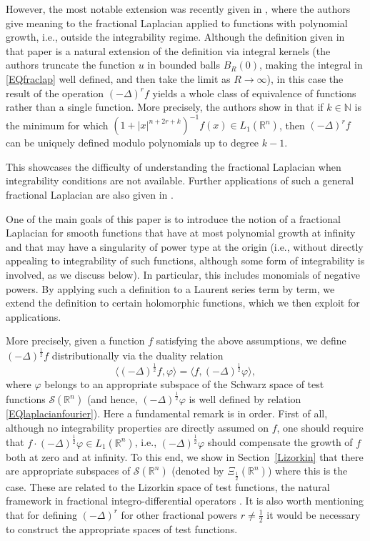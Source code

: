 \documentclass[reqno,11pt]{amsart}
\theoremstyle{definition}
\def\R{\mathbb{R}}
\begin{document}
\medskip

However, the most notable extension was recently given in \cite{POTENZEVALDIN}, where the authors give meaning to the fractional Laplacian applied to functions with polynomial growth, i.e., outside the integrability regime. Although the definition given in that paper is a natural extension of the definition via integral kernels (the authors truncate the function $u$ in bounded balls $B_R(0)$, making the integral in \eqref{EQfraclap} well defined, and then take the limit as $R\to\infty$), in this case the result of the operation $(-\Delta)^r f$ yields a whole class of equivalence of functions rather than a single function. More precisely, the authors show in \cite[Lemma~1.2]{POTENZEVALDIN} that if $k\in \mathbb{N}$ is the minimum for which  $(1+|x|^{n+2r+k})^{-1}f(x)\in L_1(\R^n)$, then $(-\Delta)^r f$ can be uniquely defined modulo polynomials up to degree $k-1$.


This showcases the difficulty of understanding the fractional Laplacian when integrability conditions are not available. Further applications of such a general fractional Laplacian are also given in \cite{POTENZEVALDIN}.

\medskip

One of the main goals of this paper is to introduce the notion of a fractional Laplacian for smooth functions that have at most polynomial growth at infinity and that may have a singularity of power type at the origin (i.e., without directly appealing to integrability of such functions, although some form of integrability is involved, as we discuss below). In particular, this includes monomials of negative powers. By applying such a definition to a Laurent series term by term, we extend the definition to certain holomorphic functions, which we then exploit for applications.


More precisely, given a function $f$ satisfying the above assumptions, we define $(-\Delta)^\frac{1}{2}f$ distributionally via the duality relation
\[
\big\langle (-\Delta)^\frac{1}{2} f,\varphi\big\rangle  = \big\langle f, (-\Delta)^\frac{1}{2} \varphi \big\rangle,
\]
where $\varphi$ belongs to an appropriate subspace of the Schwarz space of test functions $\mathcal{S}(\R^n)$ (and hence, $(-\Delta)^\frac{1}{2}\varphi$ is well defined by relation \eqref{EQlaplacianfourier}). Here a fundamental remark is in order. First of all, although no integrability properties are directly assumed on $f$, one should require that $f\cdot (-\Delta)^\frac{1}{2}\varphi\in L_1(\R^n)$, i.e., $(-\Delta)^\frac{1}{2}\varphi$ should compensate the growth of $f$ both at zero and at infinity. To this end, we show in Section~\ref{Lizorkin} that there are appropriate subspaces of $\mathcal{S}(\R^n)$ (denoted by $\Xi_\frac{1}{2}(\R^n)$) where this is the case. These are related to the Lizorkin space of test functions, the natural framework in fractional integro-differential operators \cite{SKM}. It is also worth mentioning that for defining $(-\Delta)^r$ for other fractional powers $r\neq \frac{1}{2}$ it would be necessary to construct the appropriate spaces of test functions.
\end{document}
